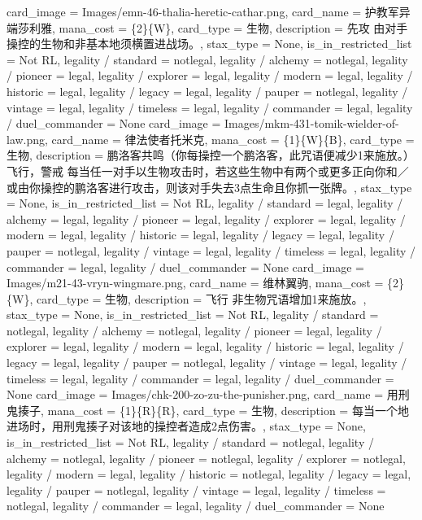 \documentclass[lang = cn, color = black, 10pt]{AllThatStax}
\begin{document}
\card
{
	card_image = Images/emn-46-thalia-heretic-cathar.png,
	card_name = 护教军异端莎利雅,
	mana_cost = \{2\}\{W\},
	card_type = 生物,
	description = 先攻
	由对手操控的生物和非基本地须横置进战场。,
	stax_type = None,
	is_in_restricted_list = Not RL,
	legality / standard = notlegal,
	legality / alchemy = notlegal,
	legality / pioneer = legal,
	legality / explorer = legal,
	legality / modern = legal,
	legality / historic = legal,
	legality / legacy = legal,
	legality / pauper = notlegal,
	legality / vintage = legal,
	legality / timeless = legal,
	legality / commander = legal,
	legality / duel_commander = None
}
\card
{
	card_image = Images/mkm-431-tomik-wielder-of-law.png,
	card_name = 律法使者托米克,
	mana_cost = \{1\}\{W\}\{B\},
	card_type = 生物,
	description = 鹏洛客共鸣（你每操控一个鹏洛客，此咒语便减少{1}来施放。）
	飞行，警戒
	每当任一对手以生物攻击时，若这些生物中有两个或更多正向你和／或由你操控的鹏洛客进行攻击，则该对手失去3点生命且你抓一张牌。,
	stax_type = None,
	is_in_restricted_list = Not RL,
	legality / standard = legal,
	legality / alchemy = legal,
	legality / pioneer = legal,
	legality / explorer = legal,
	legality / modern = legal,
	legality / historic = legal,
	legality / legacy = legal,
	legality / pauper = notlegal,
	legality / vintage = legal,
	legality / timeless = legal,
	legality / commander = legal,
	legality / duel_commander = None
}
\card
{
	card_image = Images/m21-43-vryn-wingmare.png,
	card_name = 维林翼驹,
	mana_cost = \{2\}\{W\},
	card_type = 生物,
	description = 飞行
	非生物咒语增加{1}来施放。,
	stax_type = None,
	is_in_restricted_list = Not RL,
	legality / standard = notlegal,
	legality / alchemy = notlegal,
	legality / pioneer = legal,
	legality / explorer = legal,
	legality / modern = legal,
	legality / historic = legal,
	legality / legacy = legal,
	legality / pauper = notlegal,
	legality / vintage = legal,
	legality / timeless = legal,
	legality / commander = legal,
	legality / duel_commander = None
}
\card
{
	card_image = Images/chk-200-zo-zu-the-punisher.png,
	card_name = 用刑鬼揍子,
	mana_cost = \{1\}\{R\}\{R\},
	card_type = 生物,
	description = 每当一个地进场时，用刑鬼揍子对该地的操控者造成2点伤害。,
	stax_type = None,
	is_in_restricted_list = Not RL,
	legality / standard = notlegal,
	legality / alchemy = notlegal,
	legality / pioneer = notlegal,
	legality / explorer = notlegal,
	legality / modern = legal,
	legality / historic = notlegal,
	legality / legacy = legal,
	legality / pauper = notlegal,
	legality / vintage = legal,
	legality / timeless = notlegal,
	legality / commander = legal,
	legality / duel_commander = None
}
\end{document}
